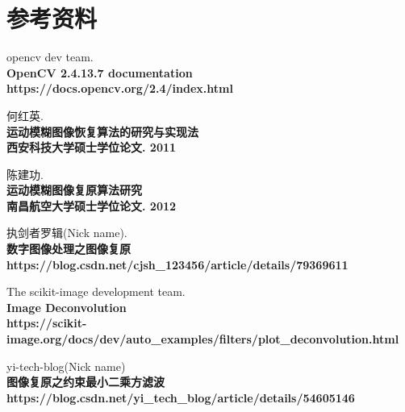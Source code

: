 \documentclass[11pt]{ctexart}
\begin{document}
\section{参考资料}

\begin{thebibliography}{99}

 opencv dev team.\\
{\bf OpenCV 2.4.13.7 documentation\\}
{\bf https://docs.opencv.org/2.4/index.html\\}

 何红英.\\
{\bf 运动模糊图像恢复算法的研究与实现法\\}
{\bf 西安科技大学硕士学位论文. 2011\\}

 陈建功. \\
{\bf 运动模糊图像复原算法研究 \\}
{\bf 南昌航空大学硕士学位论文. 2012\\}

 执剑者罗辑(Nick name). \\
{\bf 数字图像处理之图像复原 \\}
{\bf https://blog.csdn.net/cjsh\_123456/article/details/79369611\\}


 The scikit-image development team.\\
{\bf Image Deconvolution \\}
{\bf https://scikit-image.org/docs/dev/auto\_examples/filters/plot\_deconvolution.html\\}

 yi-tech-blog(Nick name)\\
{\bf 图像复原之约束最小二乘方滤波\\}
{\bf https://blog.csdn.net/yi_tech_blog/article/details/54605146\\}


\end{thebibliography}
\end{document}
